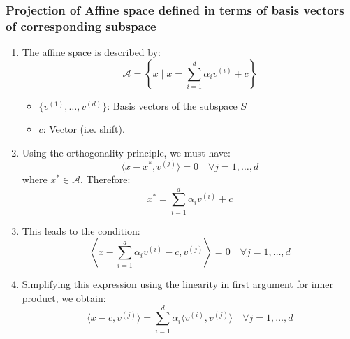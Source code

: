         \subsubsection{Projection of Affine space defined in terms of basis vectors of corresponding subspace}
        \begin{derivation}
            \begin{enumerate}
                \item The affine space is described by:
                \[
                \mathcal{A} = \left\{ x \mid x = \sum_{i=1}^{d} \alpha_i v^{(i)} + c \right\}
                \]
                \begin{itemize}
                    \item $\{v^{(1)}, \dots, v^{(d)}\}$: Basis vectors of the subspace $S$
                    \item $c$: Vector (i.e. shift).
                \end{itemize}
            
                \item Using the orthogonality principle, we must have:
                \[
                \langle x - x^*, v^{(j)} \rangle = 0 \quad \forall j = 1, \dots, d
                \]
                where $x^* \in \mathcal{A}$. Therefore:
                \[
                x^* = \sum_{i=1}^{d} \alpha_i v^{(i)} + c
                \]
            
                \item This leads to the condition:
                \[
                \left\langle x - \sum_{i=1}^{d} \alpha_i v^{(i)} - c, v^{(j)} \right\rangle = 0 \quad \forall j = 1, \dots, d
                \]
            
                \item Simplifying this expression using the linearity in first argument for inner product, we obtain:
                \[
                \langle x - c, v^{(j)} \rangle = \sum_{i=1}^{d} \alpha_i \langle v^{(i)}, v^{(j)} \rangle \quad \forall j = 1, \dots, d
                \]
            

\end{enumerate}
\end{derivation}
